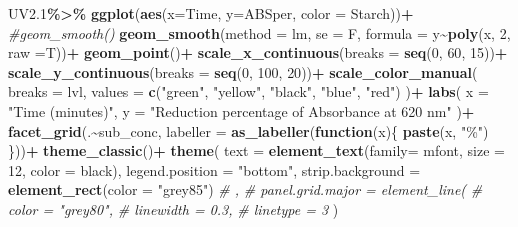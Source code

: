 \documentclass[
  12pt,
]{article}
\newenvironment{Shaded}{\begin{snugshade}}{\end{snugshade}}
\newcommand{\AttributeTok}[1]{\textcolor[rgb]{0.13,0.29,0.53}{#1}}
\newcommand{\CommentTok}[1]{\textcolor[rgb]{0.56,0.35,0.01}{\textit{#1}}}
\newcommand{\ControlFlowTok}[1]{\textcolor[rgb]{0.13,0.29,0.53}{\textbf{#1}}}
\newcommand{\DecValTok}[1]{\textcolor[rgb]{0.00,0.00,0.81}{#1}}
\newcommand{\FloatTok}[1]{\textcolor[rgb]{0.00,0.00,0.81}{#1}}
\newcommand{\FunctionTok}[1]{\textcolor[rgb]{0.13,0.29,0.53}{\textbf{#1}}}
\newcommand{\NormalTok}[1]{#1}
\newcommand{\SpecialCharTok}[1]{\textcolor[rgb]{0.81,0.36,0.00}{\textbf{#1}}}
\newcommand{\StringTok}[1]{\textcolor[rgb]{0.31,0.60,0.02}{#1}}
\begin{document}
\begin{Shaded}
\begin{Highlighting}[]
\NormalTok{UV2}\FloatTok{.1}\SpecialCharTok{\%\textgreater{}\%} 
  \FunctionTok{ggplot}\NormalTok{(}\FunctionTok{aes}\NormalTok{(}\AttributeTok{x=}\NormalTok{Time, }\AttributeTok{y=}\NormalTok{ABSper, }\AttributeTok{color =}\NormalTok{ Starch))}\SpecialCharTok{+}
  \CommentTok{\#geom\_smooth()}
  \FunctionTok{geom\_smooth}\NormalTok{(}\AttributeTok{method =} \StringTok{\textquotesingle{}lm\textquotesingle{}}\NormalTok{, }\AttributeTok{se =}\NormalTok{ F,}
              \AttributeTok{formula =}\NormalTok{ y}\SpecialCharTok{\textasciitilde{}}\FunctionTok{poly}\NormalTok{(x, }\DecValTok{2}\NormalTok{, }\AttributeTok{raw =}\NormalTok{T))}\SpecialCharTok{+}
  \FunctionTok{geom\_point}\NormalTok{()}\SpecialCharTok{+}
  \FunctionTok{scale\_x\_continuous}\NormalTok{(}\AttributeTok{breaks =} \FunctionTok{seq}\NormalTok{(}\DecValTok{0}\NormalTok{, }\DecValTok{60}\NormalTok{, }\DecValTok{15}\NormalTok{))}\SpecialCharTok{+}
  \FunctionTok{scale\_y\_continuous}\NormalTok{(}\AttributeTok{breaks =} \FunctionTok{seq}\NormalTok{(}\DecValTok{0}\NormalTok{, }\DecValTok{100}\NormalTok{, }\DecValTok{20}\NormalTok{))}\SpecialCharTok{+}
  \FunctionTok{scale\_color\_manual}\NormalTok{(}
    \AttributeTok{breaks =}\NormalTok{ lvl,}
    \AttributeTok{values =} \FunctionTok{c}\NormalTok{(}\StringTok{"green"}\NormalTok{,}
               \StringTok{"yellow"}\NormalTok{,}
               \StringTok{"black"}\NormalTok{,}
               \StringTok{"blue"}\NormalTok{,}
               \StringTok{"red"}\NormalTok{)}
\NormalTok{  )}\SpecialCharTok{+}
  \FunctionTok{labs}\NormalTok{(}
    \AttributeTok{x =} \StringTok{"Time (minutes)"}\NormalTok{,}
    \AttributeTok{y =} \StringTok{"Reduction percentage of}
\StringTok{    Absorbance at 620 nm"}
\NormalTok{  )}\SpecialCharTok{+}
  \FunctionTok{facet\_grid}\NormalTok{(.}\SpecialCharTok{\textasciitilde{}}\NormalTok{sub\_conc,}
             \AttributeTok{labeller =} \FunctionTok{as\_labeller}\NormalTok{(}\ControlFlowTok{function}\NormalTok{(x)\{}
               \FunctionTok{paste}\NormalTok{(x, }\StringTok{"\%"}\NormalTok{)}
\NormalTok{             \}))}\SpecialCharTok{+}
  \FunctionTok{theme\_classic}\NormalTok{()}\SpecialCharTok{+}
  \FunctionTok{theme}\NormalTok{(}
    \AttributeTok{text =} \FunctionTok{element\_text}\NormalTok{(}\AttributeTok{family=}\NormalTok{ mfont,}
                        \AttributeTok{size =} \DecValTok{12}\NormalTok{,}
                        \AttributeTok{color =} \StringTok{\textquotesingle{}black\textquotesingle{}}\NormalTok{),}
    \AttributeTok{legend.position =} \StringTok{"bottom"}\NormalTok{,}
    \AttributeTok{strip.background =} \FunctionTok{element\_rect}\NormalTok{(}\AttributeTok{color =} \StringTok{"grey85"}\NormalTok{)}
    \CommentTok{\# ,}
    \CommentTok{\# panel.grid.major = element\_line(}
    \CommentTok{\#   color = "grey80",}
    \CommentTok{\#   linewidth = 0.3,}
    \CommentTok{\#   linetype = 3}
\NormalTok{  )}
\end{Highlighting}
\end{Shaded}
\end{document}
